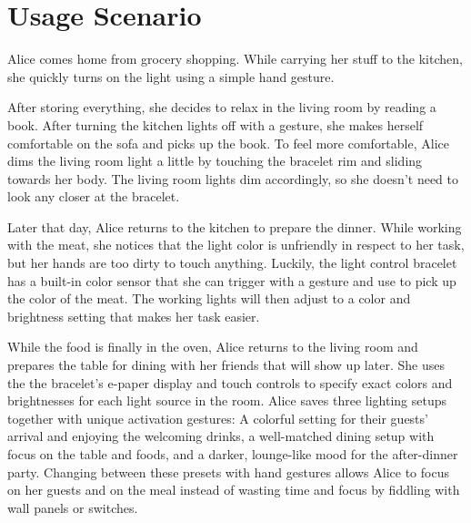 \chapter{Usage Scenario}
Alice comes home from grocery shopping. While carrying her stuff to the kitchen, she quickly turns on the light using a simple hand gesture.

After storing everything, she decides to relax in the living room by reading a book. After turning the kitchen lights off with a gesture, she makes herself comfortable on the sofa and picks up the book. To feel more comfortable, Alice dims the living room light a little by touching the bracelet rim and sliding towards her body. The living room lights dim accordingly, so she doesn't need to look any closer at the bracelet.

Later that day, Alice returns to the kitchen to prepare the dinner. While working with the meat, she notices that the light color is unfriendly in respect to her task, but her hands are too dirty to touch anything. Luckily, the light control bracelet has a built-in color sensor that she can trigger with a gesture and use to pick up the color of the meat. The working lights will then adjust to a color and brightness setting that makes her task easier.

While the food is finally in the oven, Alice returns to the living room and prepares the table for dining with her friends that will show up later. She uses the the bracelet's e-paper display and touch controls to specify exact colors and brightnesses for each light source in the room. Alice saves three lighting setups together with unique activation gestures: A colorful setting for their guests' arrival and enjoying the welcoming drinks, a well-matched dining setup with focus on the table and foods, and a darker, lounge-like mood for the after-dinner party. Changing between these presets with hand gestures allows Alice to focus on her guests and on the meal instead of wasting time and focus by fiddling with wall panels or switches.
